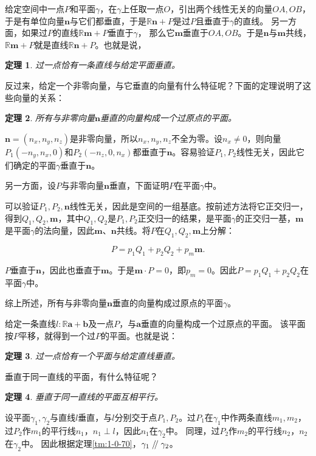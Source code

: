 \documentclass[12pt,UTF8]{ctexbook}
\newtheorem{tm}{定理}[section]
\renewcommand\parallel{\mathrel{/\mskip-4mu/}}
\begin{document}
给定空间中一点$P$和平面$\gamma$，在$\gamma$上任取一点$O$，引出两个线性无关的向量$OA,OB$，
于是有单位向量$\mathbf{n}$与它们都垂直，于是$\mathbb{R}\mathbf{n} + P$是过$P$且垂直于$\gamma$的直线。
另一方面，如果过$P$的直线$\mathbb{R}\mathbf{m} + P$垂直于$\gamma$，
那么它$\mathbf{m}$垂直于$OA,OB$。于是$\mathbf{n}$与$\mathbf{m}$共线，
$\mathbb{R}\mathbf{m} + P$就是直线$\mathbb{R}\mathbf{n} + P$。也就是说，
\begin{tm}
    过一点恰有一条直线与给定平面垂直。
\end{tm}
反过来，给定一个非零向量，与它垂直的向量有什么特征呢？下面的定理说明了这些向量的关系：
\begin{tm}
    所有与非零向量$\mathbf{n}$垂直的向量构成一个过原点的平面。    
\end{tm}
\begin{proof2}
$\mathbf{n} = (n_x, n_y, n_z)$是非零向量，所以$n_x, n_y, n_z$不全为零。设$n_x\neq 0$，则向量$P_1(-n_y, n_x, 0)$和$P_2(-n_z, 0, n_x)$都垂直于$\mathbf{n}$。容易验证$P_1,P_2$线性无关，因此它们确定的平面$\gamma$垂直于$\mathbf{n}$。

另一方面，设$P$与非零向量$\mathbf{n}$垂直，下面证明$P$在平面$\gamma$中。

可以验证$P_1, P_2, \mathbf{n}$线性无关，因此是空间的一组基底。按前述方法将它正交归一，得到$Q_1, Q_2,\mathbf{m}$，其中$Q_1,Q_2$是$P_1, P_2$正交归一的结果，是平面$\gamma$的正交归一基，$\mathbf{m}$是平面$\gamma$的法向量，因此$\mathbf{m}$、$\mathbf{n}$共线。将$P$在$Q_1, Q_2,\mathbf{m}$上分解：

$$ P = p_1Q_1 + p_2Q_2 + p_m\mathbf{m}.$$

$P$垂直于$\mathbf{n}$，因此也垂直于$\mathbf{m}$。于是$\mathbf{m}\cdot P = 0$，即$p_m = 0$。因此$P = p_1Q_1 + p_2Q_2$在平面$\gamma$中。

综上所述，所有与非零向量$\mathbf{n}$垂直的向量构成过原点的平面$\gamma$。

\end{proof2}

给定一条直线$l:\mathbb{R}\mathbf{a} + \mathbf{b}$及一点$P$，与$\mathbf{a}$垂直的向量构成一个过原点的平面。
该平面按$P$平移，就得到一个过$P$的平面。也就是说：
\begin{tm}
    过一点恰有一个平面与给定直线垂直。
\end{tm}

垂直于同一直线的平面，有什么特征呢？
\begin{tm}
    垂直于同一直线的平面互相平行。
\end{tm}
\begin{proof2}
    
设平面$\gamma_1,\gamma_2$与直线$l$垂直，与$l$分别交于点$P_1,P_2$。过$P_1$在$\gamma_1$中作两条直线$m_1,m_2$，
过$P_2$作$m_1$的平行线$n_1$，$n_1\perp l$，因此$n_1$在$\gamma_2$中。
同理，过$P_2$作$m_2$的平行线$n_2$，$n_2$在$\gamma_2$中。
因此根据定理\ref{tm:1-0-70}，$\gamma_1\parallel \gamma_2$。
\end{proof2}
\end{document}
